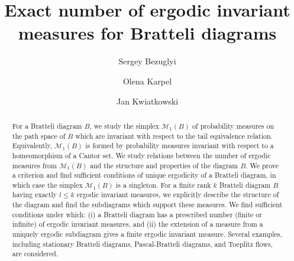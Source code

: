 \documentclass[11pt, english, reqno]{amsart}
\theoremstyle{definition}
\theoremstyle{remark}
\theoremstyle{plain}
\numberwithin{equation}{section}
\begin{document}
\title{Exact number of ergodic invariant measures for Bratteli diagrams}


\date{}


\author{Sergey Bezuglyi}
\address{Department of Mathematics, University of Iowa, Iowa City,
52242 IA, USA}


\author{Olena Karpel}
\address{B. Verkin Institute for Low Temperature Physics and Engineering,
Kharkiv, Ukraine; Department of Dynamical Systems, Institute of Mathematics of
Polish Academy of Sciences, Wroclaw, Poland}



\author{Jan Kwiatkowski}

\address{Kotarbinski University of Information Technology and Management,
Olsztyn, Poland}




\begin{abstract}
For a Bratteli diagram $B$, we study the simplex $\mathcal{M}_1(B)$ of
 probability measures on the path space of $B$ 
which are invariant with respect to the tail equivalence relation. Equivalently, 
$\mathcal{M}_1(B)$ is formed by  probability measures  invariant with
 respect to a homeomorphism of a Cantor set.  
We study relations between the number 
of ergodic measures from  $\mathcal{M}_1(B)$  and the structure and 
properties  of the diagram $B$. 
We prove a criterion and find sufficient conditions  of unique ergodicity of a
 Bratteli diagram, in which case the simplex 
$\mathcal{M}_1(B)$ is a singleton. For   a 
finite rank $k$ Bratteli diagram $B$ having exactly $l \leq k$ 
ergodic invariant measures, we explicitly describe the structure of the
 diagram and  find the subdiagrams  which support these measures. We find
sufficient  conditions under  which: (i) a Bratteli diagram has a prescribed
 number (finite or infinite) of ergodic invariant measures, and 
  (ii) the extension of a measure from a uniquely ergodic subdiagram gives a finite ergodic invariant measure.  Several
 examples, including stationary Bratteli diagrams, Pascal-Bratteli diagrams, and
 Toeplitz flows, are  considered.
\end{abstract}
\maketitle
\tableofcontents
\end{document}
